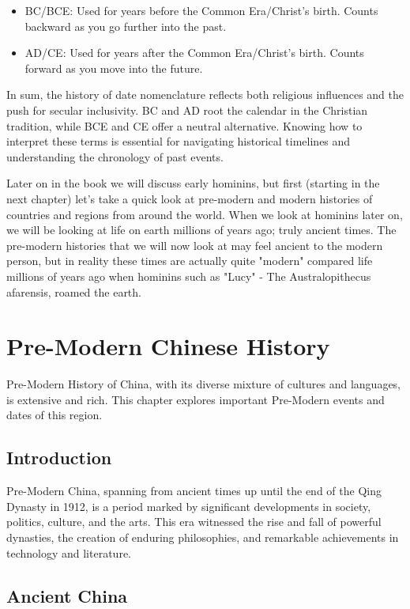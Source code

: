 \documentclass[a4paper,12pt]{book}
\begin{document}
\begin{itemize}
    \item BC/BCE: Used for years before the Common Era/Christ’s birth. Counts backward as you go further into the past.
    \item AD/CE: Used for years after the Common Era/Christ’s birth. Counts forward as you move into the future.
\end{itemize}

In sum, the history of date nomenclature reflects both religious influences and the push for secular inclusivity. BC and AD root the calendar in the Christian tradition, while BCE and CE offer a neutral alternative. Knowing how to interpret these terms is essential for navigating historical timelines and understanding the chronology of past events.

Later on in the book we will discuss early hominins, but first (starting in the next chapter) let's take a quick look at pre-modern and modern histories of countries and regions from around the world. When we look at hominins later on, we will be looking at life on earth millions of years ago; truly ancient times. The pre-modern histories that we will now look at may feel ancient to the modern person, but in reality these times are actually quite "modern" compared life millions of years ago when hominins such as "Lucy" - The Australopithecus afarensis, roamed the earth. 

\chapter{Pre-Modern Chinese History}
Pre-Modern History of China, with its diverse mixture of cultures and languages, is extensive and rich. This chapter explores important Pre-Modern events and dates of this region.

\section{Introduction}
Pre-Modern China, spanning from ancient times up until the end of the Qing Dynasty in 1912, is a period marked by significant developments in society, politics, culture, and the arts. This era witnessed the rise and fall of powerful dynasties, the creation of enduring philosophies, and remarkable achievements in technology and literature.

\section{Ancient China}
\end{document}
